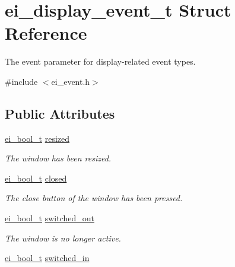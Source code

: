 \hypertarget{structei__display__event__t}{}\section{ei\+\_\+display\+\_\+event\+\_\+t Struct Reference}
\label{structei__display__event__t}


The event parameter for display-\/related event types.  




{\ttfamily \#include $<$ei\+\_\+event.\+h$>$}

\subsection*{Public Attributes}
\begin{DoxyCompactItemize}
\item 
\hyperlink{ei__types_8h_a383b9af13bd6a0a893096ead3c4d8e28}{ei\+\_\+bool\+\_\+t} \hyperlink{structei__display__event__t_a32e23d401fad708e99701cde6d30e9d9}{resized}\hypertarget{structei__display__event__t_a32e23d401fad708e99701cde6d30e9d9}{}\label{structei__display__event__t_a32e23d401fad708e99701cde6d30e9d9}

\begin{DoxyCompactList}\small\item\em The window has been resized. \end{DoxyCompactList}\item 
\hyperlink{ei__types_8h_a383b9af13bd6a0a893096ead3c4d8e28}{ei\+\_\+bool\+\_\+t} \hyperlink{structei__display__event__t_a29dcb5bdf052575615f3566839c630ce}{closed}\hypertarget{structei__display__event__t_a29dcb5bdf052575615f3566839c630ce}{}\label{structei__display__event__t_a29dcb5bdf052575615f3566839c630ce}

\begin{DoxyCompactList}\small\item\em The close button of the window has been pressed. \end{DoxyCompactList}\item 
\hyperlink{ei__types_8h_a383b9af13bd6a0a893096ead3c4d8e28}{ei\+\_\+bool\+\_\+t} \hyperlink{structei__display__event__t_ae688be60429c4516a9ba9a0813902252}{switched\+\_\+out}\hypertarget{structei__display__event__t_ae688be60429c4516a9ba9a0813902252}{}\label{structei__display__event__t_ae688be60429c4516a9ba9a0813902252}

\begin{DoxyCompactList}\small\item\em The window is no longer active. \end{DoxyCompactList}\item 
\hyperlink{ei__types_8h_a383b9af13bd6a0a893096ead3c4d8e28}{ei\+\_\+bool\+\_\+t} \hyperlink{structei__display__event__t_a42bd677878c67d8b4262b0e3db22fbc8}{switched\+\_\+in}\hypertarget{structei__display__event__t_a42bd677878c67d8b4262b0e3db22fbc8}{}\label{structei__display__event__t_a42bd677878c67d8b4262b0e3db22fbc8}


\end{DoxyCompactItemize}
